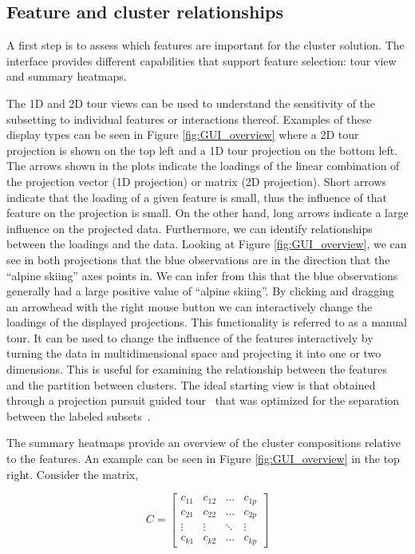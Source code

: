 \documentclass[article]{ajs}
\begin{document}
\subsection{Feature and cluster relationships}

A first step is to assess which features are important for the cluster solution. The interface provides different capabilities that support feature selection: tour view and summary heatmaps. 

The 1D and 2D tour views can be used to understand the sensitivity of the subsetting to individual features or interactions thereof. Examples of these display types can be seen in Figure \ref{fig:GUI_overview} where a 2D tour projection is shown on the top left and a 1D tour projection on the bottom left. The arrows shown in the plots indicate the loadings of the linear combination of the projection vector (1D projection) or matrix (2D projection). Short arrows indicate that the loading of a given feature is small, thus the influence of that feature on the projection is small. On the other hand, long arrows indicate a large influence on the projected data. Furthermore, we can identify relationships between the loadings and the data. Looking at Figure \ref{fig:GUI_overview}, we can see in both projections that the blue observations are in the direction that the ``alpine skiing'' axes points in. We can infer from this that the blue observations generally had a large positive value of ``alpine skiing''. By clicking and dragging an arrowhead with the right mouse button we can interactively change the loadings of the displayed projections. This functionality is referred to as a manual tour. It can be used to change the influence of the features interactively by turning the data in multidimensional space and projecting it into one or two dimensions. This is useful for examining the relationship between the features and the partition between clusters. The ideal starting view is that obtained through a projection pursuit guided tour~\citep{CBCH94} that was optimized for the separation between the labeled subsets~\citep{lckl2005}.

The summary heatmaps provide an overview of the cluster compositions relative to the features. An example can be seen in Figure \ref{fig:GUI_overview} in the top right. Consider the matrix,

\[
C = \left[ \begin{array}{cccc} c_{11} & c_{12} & \dots & c_{1p} \\
                                              c_{21} & c_{22} & \dots & c_{2p} \\
                                              \vdots &  \vdots & \ddots &  \vdots \\
                                              c_{k1} & c_{k2} & \dots & c_{kp}
                                              \end{array} \right]
\]
\end{document}
